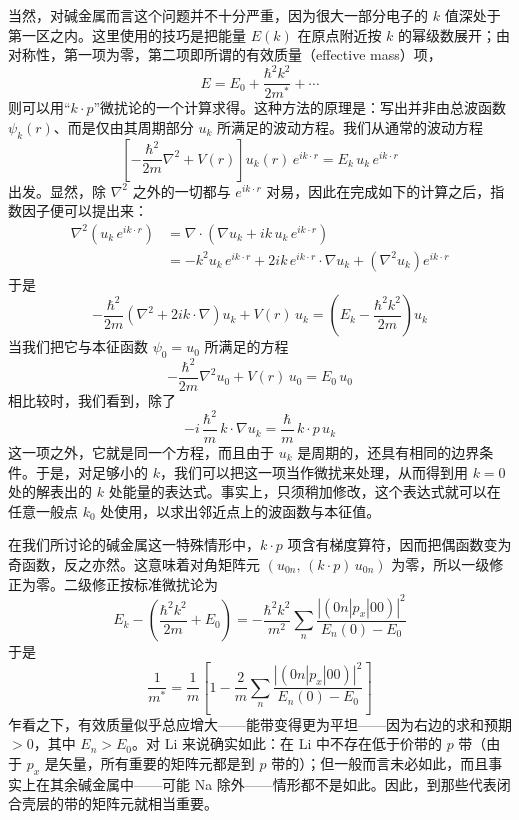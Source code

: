 当然，对碱金属而言这个问题并不十分严重，因为很大一部分电子的 $k$ 值深处于第一区之内。这里使用的技巧是把能量 $E(k)$ 在原点附近按 $k$ 的幂级数展开；由对称性，第一项为零，第二项即所谓的有效质量（effective mass）项，
\begin{equation*}
E=E_0+\frac{\hbar^2 k^2}{2m^*}+\cdots
\end{equation*}
则可以用“$k\cdot p$”微扰论的一个计算求得。这种方法的原理是：写出并非由总波函数 $\psi_k(r)$、而是仅由其周期部分 $u_k$ 所满足的波动方程。我们从通常的波动方程
\begin{equation*}
\left[-\frac{\hbar^2}{2m}\nabla^2+V(r)\right]u_k(r)\,e^{ik\cdot r}=E_k\,u_k\,e^{ik\cdot r}
\end{equation*}
出发。显然，除 $\nabla^2$ 之外的一切都与 $e^{ik\cdot r}$ 对易，因此在完成如下的计算之后，指数因子便可以提出来：
\begin{align*}
\nabla^2\left(u_k\,e^{ik\cdot r}\right)&=\nabla\cdot\left(\nabla u_k+ik\,u_k\,e^{ik\cdot r}\right)\\
&=-k^2 u_k\,e^{ik\cdot r}+2ik\,e^{ik\cdot r}\cdot\nabla u_k+\left(\nabla^2 u_k\right)e^{ik\cdot r}
\end{align*}
于是
\begin{equation*}
-\frac{\hbar^2}{2m}\left(\nabla^2+2ik\cdot\nabla\right)u_k+V(r)\,u_k=\left(E_k-\frac{\hbar^2 k^2}{2m}\right)u_k
\end{equation*}
当我们把它与本征函数 $\psi_0=u_0$ 所满足的方程
\begin{equation*}
-\frac{\hbar^2}{2m}\nabla^2 u_0+V(r)\,u_0=E_0\,u_0
\end{equation*}
相比较时，我们看到，除了
\begin{equation*}
-i\,\frac{\hbar^2}{m}\,k\cdot\nabla u_k=\frac{\hbar}{m}\,k\cdot p\,u_k
\end{equation*}
这一项之外，它就是同一个方程，而且由于 $u_k$ 是周期的，还具有相同的边界条件。于是，对足够小的 $k$，我们可以把这一项当作微扰来处理，从而得到用 $k=0$ 处的解表出的 $k$ 处能量的表达式。事实上，只须稍加修改，这个表达式就可以在任意一般点 $k_0$ 处使用，以求出邻近点上的波函数与本征值。

在我们所讨论的碱金属这一特殊情形中，$k\cdot p$ 项含有梯度算符，因而把偶函数变为奇函数，反之亦然。这意味着对角矩阵元 $(u_{0n},\,(k\cdot p)\,u_{0n})$ 为零，所以一级修正为零。二级修正按标准微扰论为
\begin{equation*}
E_k-\left(\frac{\hbar^2 k^2}{2m}+E_0\right)=-\frac{\hbar^2 k^2}{m^2}\sum_n\frac{|(0n|p_x|00)|^2}{E_n(0)-E_0}
\end{equation*}
于是
\begin{equation*}
\frac{1}{m^*}=\frac{1}{m}\left[1-\frac{2}{m}\sum_n\frac{|(0n|p_x|00)|^2}{E_n(0)-E_0}\right]
\end{equation*}
乍看之下，有效质量似乎总应增大——能带变得更为平坦——因为右边的求和预期 $>0$，其中 $E_n>E_0$。对 Li 来说确实如此：在 Li 中不存在低于价带的 $p$ 带（由于 $p_x$ 是矢量，所有重要的矩阵元都是到 $p$ 带的）；但一般而言未必如此，而且事实上在其余碱金属中——可能 Na 除外——情形都不是如此。因此，到那些代表闭合壳层的带的矩阵元就相当重要。

